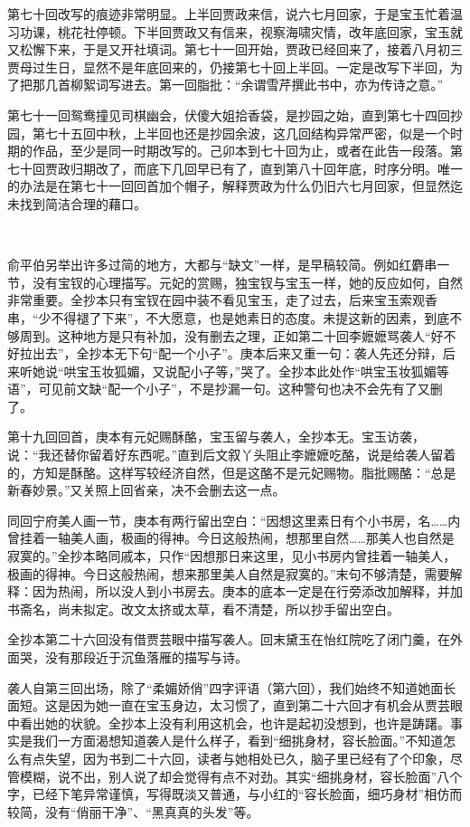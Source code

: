 \par 第七十回改写的痕迹非常明显。上半回贾政来信，说六七月回家，于是宝玉忙着温习功课，桃花社停顿。下半回贾政又有信来，视察海啸灾情，改年底回家，宝玉就又松懈下来，于是又开社填词。第七十一回开始，贾政已经回来了，接着八月初三贾母过生日，显然不是年底回来的，仍接第七十回上半回。一定是改写下半回，为了把那几首柳絮词写进去。第一回脂批：“余谓雪芹撰此书中，亦为传诗之意。”
\par 第七十一回鸳鸯撞见司棋幽会，伏傻大姐拾香袋，是抄园之始，直到第七十四回抄园，第七十五回中秋，上半回也还是抄园余波，这几回结构异常严密，似是一个时期的作品，至少是同一时期改写的。己卯本到七十回为止，或者在此告一段落。第七十回贾政归期改了，而底下几回早已有了，直到第八十回年底，时序分明。唯一的办法是在第七十一回回首加个帽子，解释贾政为什么仍旧六七月回家，但显然迄未找到简洁合理的藉口。
\par  
\par 俞平伯另举出许多过简的地方，大都与“缺文”一样，是早稿较简。例如红麝串一节，没有宝钗的心理描写。元妃的赏赐，独宝钗与宝玉一样，她的反应如何，自然非常重要。全抄本只有宝钗在园中装不看见宝玉，走了过去，后来宝玉索观香串，“少不得褪了下来”，不大愿意，也是她素日的态度。未提这新的因素，到底不够周到。这种地方是只有补加，没有删去之理，正如第二十回李嬷嬷骂袭人“好不好拉出去”，全抄本无下句“配一个小子”。庚本后来又重一句：袭人先还分辩，后来听她说“哄宝玉妆狐媚，又说配小子等，”哭了。全抄本此处作“哄宝玉妆狐媚等语”，可见前文缺“配一个小子”，不是抄漏一句。这种警句也决不会先有了又删了。
\par 第十九回回首，庚本有元妃赐酥酪，宝玉留与袭人，全抄本无。宝玉访袭，说：“我还替你留着好东西呢。”直到后文叙丫头阻止李嬷嬷吃酪，说是给袭人留着的，方知是酥酪。这样写较经济自然，但是这酪不是元妃赐物。脂批赐酪：“总是新春妙景。”又关照上回省亲，决不会删去这一点。
\par 同回宁府美人画一节，庚本有两行留出空白：“因想这里素日有个小书房，名……内曾挂着一轴美人画，极画的得神。今日这般热闹，想那里自然……那美人也自然是寂寞的。”全抄本略同戚本，只作“因想那日来这里，见小书房内曾挂着一轴美人，极画的得神。今日这般热闹，想来那里美人自然是寂寞的。”末句不够清楚，需要解释：因为热闹，所以没人到小书房去。庚本的底本一定是在行旁添改加解释，并加书斋名，尚未拟定。改文太挤或太草，看不清楚，所以抄手留出空白。
\par 全抄本第二十六回没有借贾芸眼中描写袭人。回末黛玉在怡红院吃了闭门羹，在外面哭，没有那段近于沉鱼落雁的描写与诗。
\par 袭人自第三回出场，除了“柔媚娇俏”四字评语（第六回），我们始终不知道她面长面短。这是因为她一直在宝玉身边，太习惯了，直到第二十六回才有机会从贾芸眼中看出她的状貌。全抄本上没有利用这机会，也许是起初没想到，也许是踌躇。事实是我们一方面渴想知道袭人是什么样子，看到“细挑身材，容长脸面。”不知道怎么有点失望，因为书到二十六回，读者与她相处已久，脑子里已经有了个印象，尽管模糊，说不出，别人说了却会觉得有点不对劲。其实“细挑身材，容长脸面”八个字，已经下笔异常谨慎，写得既淡又普通，与小红的“容长脸面，细巧身材”相仿而较简，没有“俏丽干净”、“黑真真的头发”等。
